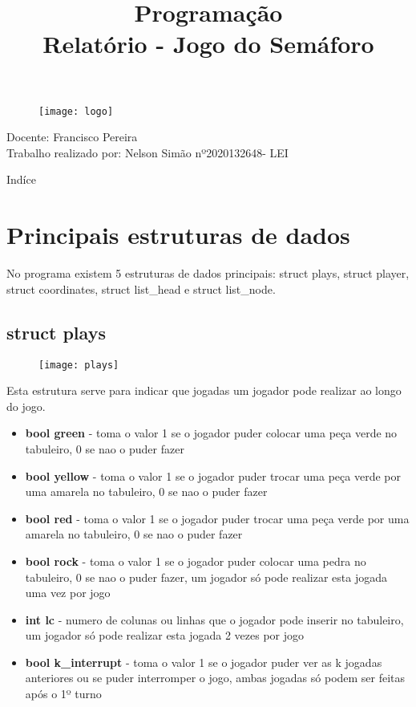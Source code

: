 \documentclass[14pt]{extarticle}
\title{Programação\\
        Relatório - Jogo do Semáforo}
\date{}
\begin{document}
\setlength{\parindent}{1em} %
\setlength{\parskip}{0.5em} %

\maketitle

\begin{figure}[h]
    \centering
    \texttt{[image: logo]}
\end{figure}

\vspace{50mm}

\begin{center}
  Docente: Francisco Pereira\\
  Trabalho realizado por: Nelson Simão nº2020132648- LEI\\
\end{center}

\newpage
\begin{center}
  \Large Indíce
\end{center}


\tableofcontents

\newpage
\section{Principais estruturas de dados}
No programa existem 5 estruturas de dados principais: struct plays, struct player, struct coordinates, struct list\_head e struct list\_node.
\subsection{struct plays}
\begin{figure}[h]
    \centering
    \texttt{[image: plays]}
\end{figure}
Esta estrutura serve para indicar que jogadas um jogador pode realizar ao longo do jogo.
\begin{itemize}
\item \textbf{bool green} - toma o valor 1 se o jogador puder colocar uma peça verde no tabuleiro, 0 se nao o puder fazer
\item \textbf{bool yellow} - toma o valor 1 se o jogador puder trocar uma peça verde por uma amarela no tabuleiro, 0 se nao o puder fazer
\item \textbf{bool red} - toma o valor 1 se o jogador puder trocar uma peça verde por uma amarela no tabuleiro, 0 se nao o puder fazer
\item \textbf{bool rock} - toma o valor 1 se o jogador puder colocar uma pedra no tabuleiro, 0 se nao o puder fazer, um jogador só pode realizar esta jogada uma vez por jogo
\item \textbf{int lc} - numero de colunas ou linhas que o jogador pode inserir no tabuleiro, um jogador só pode realizar esta jogada 2 vezes por jogo
\item \textbf{bool k\_interrupt} - toma o valor 1 se o jogador puder ver as k jogadas anteriores ou se puder interromper o jogo, ambas jogadas só podem ser feitas após o 1º turno
\end{itemize}
\end{document}
